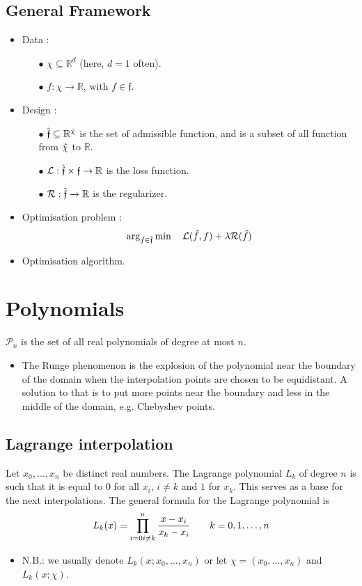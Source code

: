 \documentclass[12pt, openany]{report}
\begin{document}
\section{General Framework}
\begin{itemize}
    \item Data : 
    \begin{itemize}
        \item [\(\bullet\)] \(\chi \subseteq \mathbb{R}^d\) (here, \(d=1\) often).
        \item [\(\bullet\)] \(f:\chi \rightarrow \mathbb{R}\), with \(f\in \mathfrak{f}\).
    \end{itemize}
    \item Design : 
    \begin{itemize}
        \item [\(\bullet\)] \(\Hat{\mathfrak{f}} \subseteq \mathbb{R}^{\Hat{\chi}}\) is the set of admissible function, and is a subset of all function from \(\Hat{\chi}\) to \(\mathbb{R}\).
        \item [\(\bullet\)] \(\mathcal{L}:\Hat{\mathfrak{f}} \times \mathfrak{f}\rightarrow \mathbb{R}\) is the loss function.
        \item [\(\bullet\)] \(\mathcal{R}:\Hat{\mathfrak{f}}\rightarrow \mathbb{R}\) is the regularizer.
    \end{itemize}
    \item Optimisation problem : \[\arg_{\Hat{f}\in \Hat{\mathfrak{f}}}\min\quad \mathcal{L}(\Hat{f},f)+\lambda \mathcal{R}(\Hat{f})\]
    \item Optimisation algorithm.
\end{itemize}
\chapter{Polynomials}
\(\mathcal{P}_n\) is the set of all real polynomials of degree at most \(n\). 
\begin{itemize}
    \item The Runge phenomenon is the explosion of the polynomial near the boundary of the domain when the interpolation points are chosen to be equidistant. A solution to that is to put more points near the boundary and less in the middle of the domain, e.g. Chebyshev points.
\end{itemize}
\section{Lagrange interpolation}
Let \(x_0,\dots,x_n\) be distinct real numbers. The Lagrange polynomial \(L_k\) of degree \(n\) is such that it is equal to 0 for all \(x_i\), \(i\neq k\) and \(1\) for \(x_k\). This serves as a base for the next interpolations. The general formula for the Lagrange polynomial is 
\begin{equation}
    L_k(x) = \prod_{i=0\\i\neq k}^n \frac{x-x_i}{x_k-x_i}\qquad k=0,1,\dots,n
\end{equation}
\begin{itemize}
    \item N.B.: we usually denote \(L_k(x;x_0,\dots,x_n)\) or let \(\chi = (x_0,\dots,x_n)\) and \(L_k(x;\chi)\). 
\end{itemize}
\end{document}
